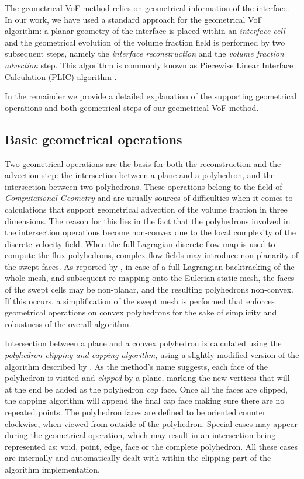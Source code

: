 The geometrical VoF method relies on geometrical information of the interface. 
In our work, we have used a standard approach for the geometrical VoF
algorithm: a planar geometry of the interface is placed within an
\emph{interface cell} and the geometrical evolution of the volume fraction
field is performed by two subsequent steps, namely the \emph{interface
reconstruction} and the \emph{volume fraction advection} step. This algorithm
is commonly known as Piecewise Linear Interface Calculation (PLIC) algorithm
\citep{RiderReconstructing1998}.

In the remainder we provide a detailed explanation of the supporting
geometrical operations and both geometrical steps of our geometrical VoF
method. 

\subsection{Basic geometrical operations}

Two geometrical operations are the basis for both the reconstruction and the
advection step: the intersection between a plane and a polyhedron, and the
intersection between two polyhedrons. These operations belong to the field of
\emph{Computational Geometry} \citep{SchneiderGTC, DeBerg2008CG} and are
usually sources of difficulties when it comes to calculations that support
geometrical advection of the volume fraction in three dimensions. The reason
for this lies in the fact that the polyhedrons involved in the intersection
operations become non-convex due to the local complexity of the discrete
velocity field. When the full Lagragian discrete flow map is used to compute
the flux polyhedrons, complex flow fields may introduce non planarity of the
swept faces. As reported by \citet{AhnShashkov2009}, in case of a full
Lagrangian backtracking of the whole mesh, and subsequent re-mapping onto the
Eulerian static mesh, the faces of the swept cells may be non-planar, and the
resulting polyhedrons non-convex. If this occurs, a simplification of the swept
mesh is performed that enforces geometrical operations on convex polyhedrons
for the sake of simplicity and robustness of the overall algorithm.

Intersection between a plane and a convex polyhedron is calculated using the
\emph{polyhedron clipping and capping algorithm}, using a slightly modified
version of the algorithm described by \citet{AhnShashkovGeometricAlg2008}. As 
the method's name suggests, each face of the polyhedron is visited and 
\emph{clipped} by a plane, marking the new vertices that will at the end be 
added as the polyhedron \emph{cap} face. Once all the faces are clipped, the 
capping algorithm will append the final cap face making sure there are no 
repeated points. The polyhedron faces are defined to be oriented counter 
clockwise, when viewed from outside of the polyhedron. Special cases may 
appear during the geometrical operation, which may result in an intersection 
being represented as: void, point, edge, face or the complete polyhedron. 
All these cases are internally and automatically dealt with within the 
clipping part of the algorithm implementation.

